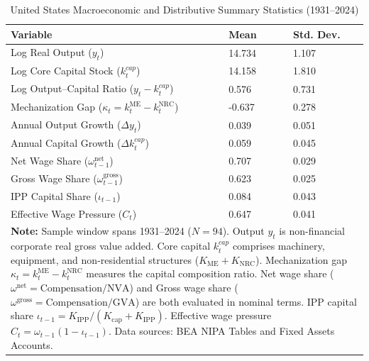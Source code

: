 \begin{table}[H]
\centering
\footnotesize
\caption{United States Macroeconomic and Distributive Summary Statistics (1931--2024)}
\label{tab:us_stylized_facts_summary}
\begin{tabular}{p{7.5cm} p{2.5cm} p{2.5cm}}
\hline\hline
Variable & Mean & Std. Dev. \\
\hline
Log Real Output ($y_t$) & 14.734 & 1.107 \\
Log Core Capital Stock ($k_t^{cap}$) & 14.158 & 1.810 \\
Log Output--Capital Ratio ($y_t - k_t^{cap}$) & 0.576 & 0.731 \\
Mechanization Gap ($\kappa_t = k_t^{\text{ME}} - k_t^{\text{NRC}}$) & -0.637 & 0.278 \\
Annual Output Growth ($\Delta y_t$) & 0.039 & 0.051 \\
Annual Capital Growth ($\Delta k_t^{cap}$) & 0.059 & 0.045 \\
Net Wage Share ($\omega_{t-1}^{\text{net}}$) & 0.707 & 0.029 \\
Gross Wage Share ($\omega_{t-1}^{\text{gross}}$) & 0.623 & 0.025 \\
IPP Capital Share ($\iota_{t-1}$) & 0.084 & 0.043 \\
Effective Wage Pressure ($C_t$) & 0.647 & 0.041 \\
\hline\hline
\multicolumn{3}{p{12.5cm}}{\scriptsize \textbf{Note:} Sample window spans 1931--2024 ($N = 94$). Output $y_t$ is non-financial corporate real gross value added. Core capital $k_t^{cap}$ comprises machinery, equipment, and non-residential structures ($K_{\text{ME}} + K_{\text{NRC}}$). Mechanization gap $\kappa_t = k_t^{\text{ME}} - k_t^{\text{NRC}}$ measures the capital composition ratio. Net wage share ($\omega^{\text{net}} = \text{Compensation} / \text{NVA}$) and Gross wage share ($\omega^{\text{gross}} = \text{Compensation} / \text{GVA}$) are both evaluated in nominal terms. IPP capital share $\iota_{t-1} = K_{\text{IPP}} / (K_{\text{cap}} + K_{\text{IPP}})$. Effective wage pressure $C_t = \omega_{t-1}(1 - \iota_{t-1})$. Data sources: BEA NIPA Tables and Fixed Assets Accounts.} \\
\end{tabular}
\end{table}


